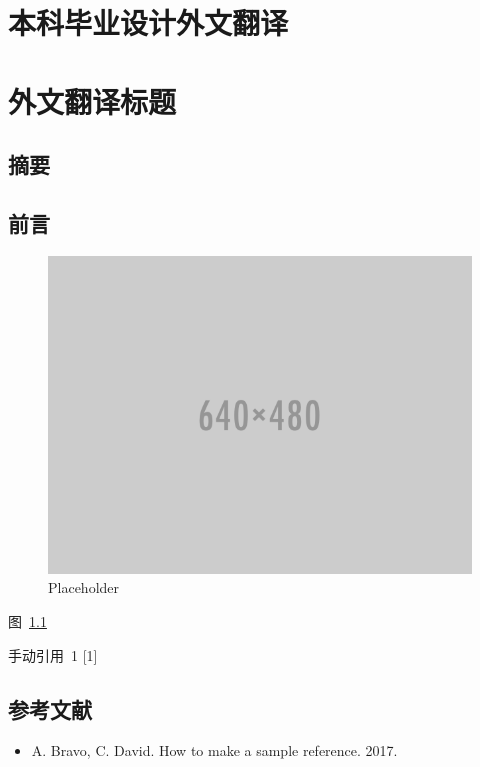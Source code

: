 \chapter{本科毕业设计外文翻译}

\begingroup
\renewcommand{\cleardoublepage}{}
\renewcommand{\clearpage}{}
\chapter*{外文翻译标题}
\endgroup

\section*{摘要}

\section{前言}

\begin{figure}[!ht]
\centering
\includegraphics[width=\linewidth,keepaspectratio]{data/waiwen/placeholder.png}
\caption{Placeholder}
\label{figure:placeholder}
\end{figure}

图~\ref{figure:placeholder}

手动引用~1 {[}1{]}

\section{参考文献}

\begin{itemize}
\item [{[}1{]}] A. Bravo, C. David. How to make a sample reference. 2017.
\end{itemize}


